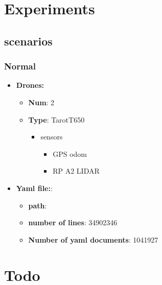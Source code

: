 \section{Experiments}
    \subsection{scenarios}
        \subsubsection{Normal}
            \begin{itemize}
                \item \textbf{Drones:}
                    \begin{itemize}
                        \item \textbf{Num}: 2
                        \item \textbf{Type}: TarotT650
                            \begin{itemize}
                                \item sensors
                                    \begin{itemize}
                                        \item GPS odom
                                        \item RP A2 LIDAR
                                    \end{itemize}
                            \end{itemize}
                    \end{itemize}
                \item \textbf{Yaml file:}:
                    \begin{itemize}
                        \item \textbf{path}: 
                        \item \textbf{number of lines}: 34902346
                        \item \textbf{Number of yaml documents}: 1041927
                    \end{itemize}
            \end{itemize}


\section{Todo}
